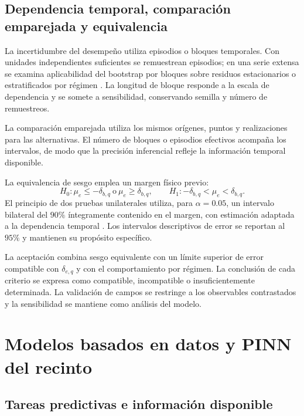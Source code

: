 \subsection{Dependencia temporal, comparación emparejada y equivalencia}
\label{met:estadistica}

La incertidumbre del desempeño utiliza episodios o bloques temporales. Con unidades independientes suficientes se remuestrean episodios; en una serie extensa se examina aplicabilidad del bootstrap por bloques sobre residuos estacionarios o estratificados por régimen \cite{kunsch1989}. La longitud de bloque responde a la escala de dependencia y se somete a sensibilidad, conservando semilla y número de remuestreos.

La comparación emparejada utiliza los mismos orígenes, puntos y realizaciones para las alternativas. El número de bloques o episodios efectivos acompaña los intervalos, de modo que la precisión inferencial refleje la información temporal disponible.

La equivalencia de sesgo emplea un margen físico previo:
\begin{equation}
H_0:\mu_e\leq-\delta_{b,q}\ \text{o}\ \mu_e\geq\delta_{b,q},
\qquad H_1:-\delta_{b,q}<\mu_e<\delta_{b,q}.
\label{met:equivalencia}
\end{equation}
El principio de dos pruebas unilaterales utiliza, para $\alpha=0.05$, un intervalo bilateral del $90\%$ íntegramente contenido en el margen, con estimación adaptada a la dependencia temporal \cite{schuirmann1987}. Los intervalos descriptivos de error se reportan al $95\%$ y mantienen su propósito específico.

La aceptación combina sesgo equivalente con un límite superior de error compatible con $\delta_{e,q}$ y con el comportamiento por régimen. La conclusión de cada criterio se expresa como compatible, incompatible o insuficientemente determinada. La validación de campos se restringe a los observables contrastados y la sensibilidad se mantiene como análisis del modelo.

\section{Modelos basados en datos y PINN del recinto}
\label{met:ml}

\subsection{Tareas predictivas e información disponible}

